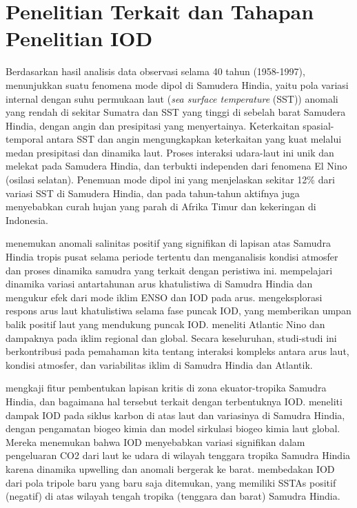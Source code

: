 \vspace{1.5pc}
\vspace{-1pc}
\section[Penelitian Terkait dan Tahapan Penelitian IOD]{Penelitian Terkait dan Tahapan Penelitian IOD}
\begin{spacing}{1.5}
	Berdasarkan hasil analisis data observasi selama 40 tahun (1958-1997),  menunjukkan suatu fenomena mode dipol di Samudera Hindia, yaitu pola variasi internal dengan suhu permukaan laut (\textit{sea surface temperature} (SST)) anomali yang rendah di sekitar Sumatra dan SST yang tinggi di sebelah barat Samudera Hindia, dengan angin dan presipitasi yang menyertainya. Keterkaitan spasial-temporal antara SST dan angin mengungkapkan keterkaitan yang kuat melalui medan presipitasi dan dinamika laut. Proses interaksi udara-laut ini unik dan melekat pada Samudera Hindia, dan terbukti independen dari fenomena El Nino (osilasi selatan). Penemuan mode dipol ini yang menjelaskan sekitar 12\% dari variasi SST di Samudera Hindia, dan pada tahun-tahun aktifnya juga menyebabkan curah hujan yang parah di Afrika Timur dan kekeringan di Indonesia. 
	
	 menemukan anomali salinitas positif yang signifikan di lapisan atas Samudra Hindia tropis pusat selama periode tertentu dan menganalisis kondisi atmosfer dan proses dinamika samudra yang terkait dengan peristiwa ini.  mempelajari dinamika variasi antartahunan arus khatulistiwa di Samudra Hindia dan mengukur efek dari mode iklim ENSO dan IOD pada arus.  mengeksplorasi respons arus laut khatulistiwa selama fase puncak IOD, yang memberikan umpan balik positif laut yang mendukung puncak IOD.  meneliti Atlantic Nino dan dampaknya pada iklim regional dan global. Secara keseluruhan, studi-studi ini berkontribusi pada pemahaman kita tentang interaksi kompleks antara arus laut, kondisi atmosfer, dan variabilitas iklim di Samudra Hindia dan Atlantik.
	
	 mengkaji fitur pembentukan lapisan kritis di zona ekuator-tropika Samudra Hindia, dan bagaimana hal tersebut terkait dengan terbentuknya IOD.  meneliti dampak IOD pada siklus karbon di atas laut dan variasinya di Samudra Hindia, dengan pengamatan biogeo kimia dan model sirkulasi biogeo kimia laut global. Mereka menemukan bahwa IOD menyebabkan variasi signifikan dalam pengeluaran CO2 dari laut ke udara di wilayah tenggara tropika Samudra Hindia karena dinamika upwelling dan anomali bergerak ke barat. \cite{Zhang2020} membedakan IOD dari pola tripole baru yang baru saja ditemukan, yang memiliki SSTAs positif (negatif) di atas wilayah tengah tropika (tenggara dan barat) Samudra Hindia.
\end{spacing}
\vspace{-1pc}
